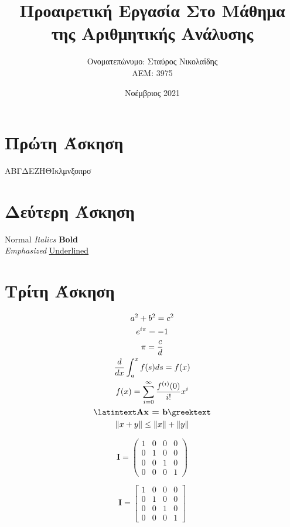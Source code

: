 \documentclass{article}
\title{Προαιρετική Εργασία
Στο Μάθημα της Αριθμητικής Ανάλυσης
}
\author{Ονοματεπώνυμο: Σταύρος Νικολαΐδης  \\  ΑΕΜ: 3975}
\date{Νοέμβριος 2021}
\newcommand{\lt}{\latintext}
\newcommand{\gt}{\greektext}
\begin{document}
\maketitle

\section{Πρώτη Άσκηση}

{\tiny Α}{\scriptsize Β}{\footnotesize Γ}{\small Δ}{\normalsize Ε}{\large Ζ}{\Large Η}{\LARGE Θ}{\huge Ι}{\Huge κ}{\huge λ}{\LARGE μ}{\Large ν}{\large ξ}{\normalsize ο}{\small π}{\footnotesize ρ}{\scriptsize σ}

\section{Δεύτερη Άσκηση}

\lt Normal \textit {Italics} \textbf {Bold} \\
\emph {Emphasized} \underline {Underlined} \gt

\section{Τρίτη Άσκηση}

\begin{gather*}
a^{2} + b^{2} = c^{2} \\
e^{i\pi} = -1 \\
\pi = \frac{c}{d} \\
\frac{d}{dx}\int_{a}^{x} f(s)ds = f(x) \\
f(x) = \sum_{i=0}^{\infty} \frac{f^{(i)}(0)}{i!}x^{i} \\
\lt\textbf{Ax = b}\gt \\
\| x + y \| \leq \| x \| + \| y \| \\
\end{gather*}

\begin{equation}
    \textbf{I} = \begin{pmatrix}
            1 & 0 & 0 & 0\\
            0 & 1 & 0 & 0\\
            0 & 0 & 1 & 0\\
            0 & 0 & 0 & 1
        \end{pmatrix}
\end{equation}

\begin{equation}
    \textbf{I} = \begin{bmatrix}
            1 & 0 & 0 & 0\\
            0 & 1 & 0 & 0\\
            0 & 0 & 1 & 0\\
            0 & 0 & 0 & 1
        \end{bmatrix}
\end{equation}
\end{document}
